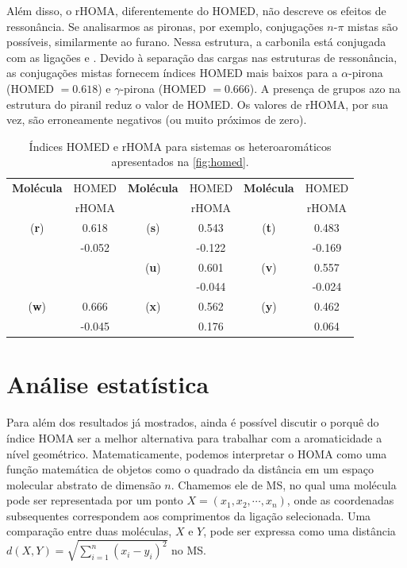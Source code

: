 Além disso, o \gls{rHOMA}, diferentemente do \gls{HOMED}, não descreve os efeitos de ressonância. Se analisarmos as pironas, por exemplo, conjugações $n$-$\pi$ mistas são possíveis, similarmente ao furano. Nessa estrutura, a carbonila está conjugada com as ligações  e . Devido à separação das cargas nas estruturas de ressonância, as conjugações mistas fornecem índices \gls{HOMED} mais baixos para a $\alpha$-pirona (\gls{HOMED} $=0.618$) e $\gamma$-pirona (\gls{HOMED} $=0.666$). A presença de grupos azo na estrutura do piranil reduz o valor de \gls{HOMED}. Os valores de \gls{rHOMA}, por sua vez, são erroneamente negativos (ou muito próximos de zero).

\begin{table}[htb]
	\centering
	\caption{\label{tab:homed/homa} Índices \gls{HOMED} e \gls{rHOMA} para sistemas os heteroaromáticos apresentados na \autoref{fig:homed}.}
	\begin{tabular}{cccccc}
		\toprule
	\textbf{Molécula} & \gls{HOMED} & \textbf{Molécula} & \gls{HOMED} & \textbf{Molécula} & \gls{HOMED}
 \\
  & \gls{rHOMA} & & \gls{rHOMA} & & \gls{rHOMA}
 \\
		\midrule
    (\textbf{r}) & 0.618 & (\textbf{s}) & 0.543 & (\textbf{t}) & 0.483 \\
     & -0.052 &  & -0.122 &  & -0.169 \\
    & & (\textbf{u}) & 0.601 & (\textbf{v}) & 0.557 \\
    & &  & -0.044 & & -0.024 \\
    (\textbf{w}) & 0.666 & (\textbf{x}) & 0.562 & (\textbf{y}) & 0.462 \\
    & -0.045 & & 0.176 & & 0.064 \\
    \bottomrule
	\end{tabular}
\end{table}

\section{Análise estatística}

Para além dos resultados já mostrados, ainda é possível discutir o porquê do índice \gls{HOMA} ser a melhor alternativa para trabalhar com a aromaticidade a nível geométrico. Matematicamente, podemos interpretar o \gls{HOMA} como uma função matemática de objetos como o quadrado da distância em um espaço molecular abstrato de dimensão $n$. Chamemos ele de \gls{MS}, no qual uma molécula pode ser representada por um ponto $X = (x_1, x_2, \cdots, x_n)$, onde as coordenadas subsequentes correspondem aos comprimentos da ligação  selecionada. Uma comparação entre duas moléculas, $X$ e $Y$, pode ser expressa como uma distância $d(X, Y) = \displaystyle \sqrt{\sum_{i=1}^{n} (x_i - y_i)^2}$ no \gls{MS}. 

